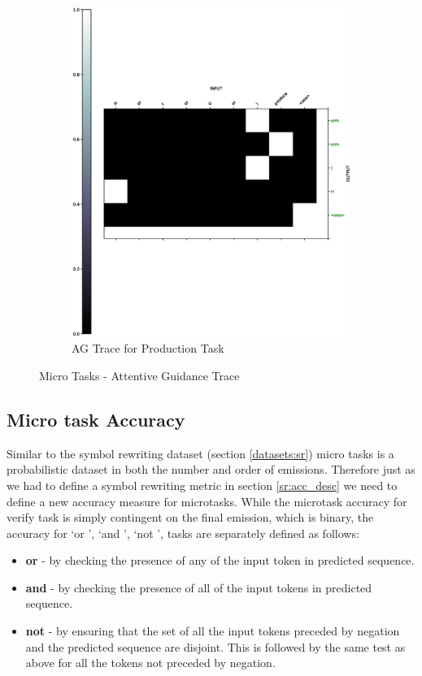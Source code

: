 \begin{figure}[ht]
\begin{subfigure}[b]{0.5\linewidth}
		\includegraphics[width=0.95\linewidth]{./figs/micro/prod-eps}
		\fi 
		\caption{AG Trace for Production Task} 
		\label{ag_prd} 
		\vspace{2ex}
	\end{subfigure}
	\caption{Micro Tasks - Attentive Guidance Trace}
	\label{mt_trace}
\end{figure}

\subsection{Micro task Accuracy}
Similar to the symbol rewriting dataset (section \ref{datasets:sr}) micro tasks is a probabilistic dataset in both the number and order of emissions. Therefore just as we had to define a symbol rewriting metric in section \ref{sr:acc_desc} we need to define a new accuracy measure for microtasks. While the microtask accuracy for verify task is simply contingent on the final emission, which is binary, the accuracy for \lq or \rq{}, \lq and \rq{}, \lq not \rq{}, tasks are separately defined as follows:

\begin{itemize}
	\item \textbf{or} - by checking the presence of any of the input token in predicted sequence.
	\item \textbf{and} - by checking the presence of all of the input tokens in predicted sequence.
	\item \textbf{not} - by ensuring that the set of all the input tokens preceded by negation and the predicted sequence are disjoint. This is followed by the same test as above for all the tokens not preceded by negation. 
\end{itemize}

